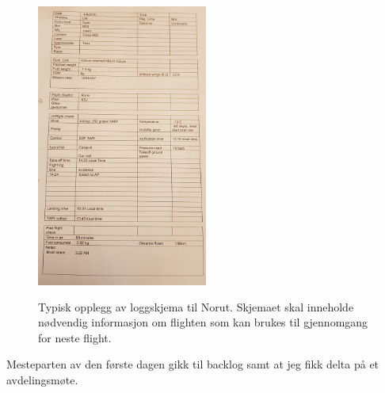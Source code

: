 \documentclass[12pt, a4paper]{article}
\begin{document}
\begin{figure}[ht]
	\centering
	\includegraphics[height= 10cm, width=0.5\textwidth]{bilder/flightlogNorut.png}
		\caption[Loggskjema]{Typisk opplegg av loggskjema til Norut. Skjemaet skal inneholde nødvendig informasjon om flighten som kan brukes til gjennomgang for neste flight. }
\end{figure}

\newpage
Mesteparten av den første dagen gikk til backlog samt at jeg fikk delta på et avdelingsmøte.\\
\end{document}
